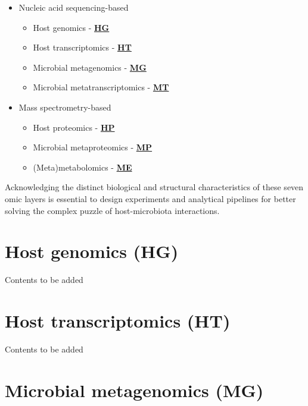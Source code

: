 \documentclass[
]{book}
\providecommand{\tightlist}{%
  \setlength{\itemsep}{0pt}\setlength{\parskip}{0pt}}
\begin{document}
\begin{itemize}
\tightlist
\item
  Nucleic acid sequencing-based

  \begin{itemize}
  \tightlist
  \item
    Host genomics - \textbf{\protect\hyperlink{host-genomics}{HG}}
  \item
    Host transcriptomics - \textbf{\protect\hyperlink{host-transcriptomics}{HT}}
  \item
    Microbial metagenomics - \textbf{\protect\hyperlink{microbial-metagenomics}{MG}}
  \item
    Microbial metatranscriptomics - \textbf{\protect\hyperlink{microbial-metatranscriptomics}{MT}}
  \end{itemize}
\item
  Mass spectrometry-based

  \begin{itemize}
  \tightlist
  \item
    Host proteomics - \textbf{\protect\hyperlink{host-proteomics}{HP}}
  \item
    Microbial metaproteomics - \textbf{\protect\hyperlink{microbial-metaproteomics}{MP}}
  \item
    (Meta)metabolomics - \textbf{\protect\hyperlink{meta-metabolomics}{ME}}
  \end{itemize}
\end{itemize}

Acknowledging the distinct biological and structural characteristics of these seven omic layers is essential to design experiments and analytical pipelines for better solving the complex puzzle of host-microbiota interactions.

\hypertarget{host-genomics}{%
\section{Host genomics (HG)}\label{host-genomics}}

Contents to be added

\hypertarget{host-transcriptomics}{%
\section{Host transcriptomics (HT)}\label{host-transcriptomics}}

Contents to be added

\hypertarget{microbial-metagenomics}{%
\section{Microbial metagenomics (MG)}\label{microbial-metagenomics}}
\end{document}
